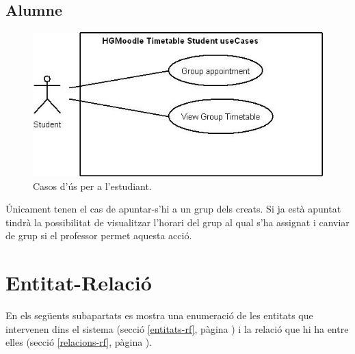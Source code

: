 \documentclass[a4paper]{report}  %
\begin{document}
\subsection{Alumne}
		\begin{figure}[H] %
		\begin{center}
		\includegraphics[width=14cm,keepaspectratio]{img/UseCases-Student-rf.jpg}
		\caption[List caption]{Casos d'ús per a l'estudiant.}
		\label{fig:UseCases-Student-rf}
		\end{center}
		\end{figure}
Únicament tenen el cas de apuntar-s’hi a un grup dels creats. Si ja està apuntat tindrà la possibilitat de visualitzar l'horari del grup al qual s'ha assignat i canviar de grup si el professor permet aquesta acció.\\
\section{Entitat-Relació}
En els següents subapartats es mostra una enumeració de les entitats que intervenen dins el sistema (secció \ref{entitats-rf}, pàgina \pageref{entitats-rf}) i la relació que hi ha entre elles (secció \ref{relacions-rf}, pàgina \pageref{relacions-rf}).
\end{document}
